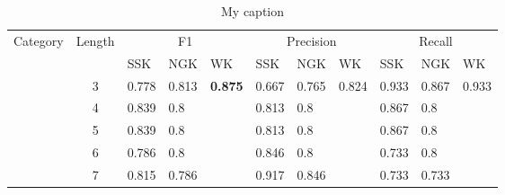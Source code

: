 \begin{table}[]
\centering
\caption{My caption}
\label{my-label}
\begin{tabular}{|c|c|l|l|l|l|l|l|l|l|l|}
\hline
Category                & Length                & \multicolumn{3}{c|}{F1}                                                                                                  & \multicolumn{3}{c|}{Precision} & \multicolumn{3}{c|}{Recall}                                                                   \\ \cline{3-11} 
\multicolumn{1}{|l|}{}  & \multicolumn{1}{l|}{} & SSK                                    & NGK                                    & WK                                     & SSK      & NGK      & WK       & SSK                           & NGK                           & WK                            \\ \hline
                        & 3                     & \cellcolor[HTML]{EFEFEF}0.778          & \cellcolor[HTML]{EFEFEF}0.813          & \cellcolor[HTML]{EFEFEF}\textbf{0.875} & 0.667    & 0.765    & 0.824    & \cellcolor[HTML]{EFEFEF}0.933 & \cellcolor[HTML]{EFEFEF}0.867 & \cellcolor[HTML]{EFEFEF}0.933 \\ \cline{2-11} 
                        & 4                     & \cellcolor[HTML]{EFEFEF}0.839          & \cellcolor[HTML]{EFEFEF}0.8            & \cellcolor[HTML]{EFEFEF}               & 0.813    & 0.8      &          & \cellcolor[HTML]{EFEFEF}0.867 & \cellcolor[HTML]{EFEFEF}0.8   & \cellcolor[HTML]{EFEFEF}      \\ \cline{2-11} 
                        & 5                     & \cellcolor[HTML]{EFEFEF}0.839          & \cellcolor[HTML]{EFEFEF}0.8            & \cellcolor[HTML]{EFEFEF}               & 0.813    & 0.8      &          & \cellcolor[HTML]{EFEFEF}0.867 & \cellcolor[HTML]{EFEFEF}0.8   & \cellcolor[HTML]{EFEFEF}      \\ \cline{2-11} 
                        & 6                     & \cellcolor[HTML]{EFEFEF}0.786          & \cellcolor[HTML]{EFEFEF}0.8            & \cellcolor[HTML]{EFEFEF}               & 0.846    & 0.8      &          & \cellcolor[HTML]{EFEFEF}0.733 & \cellcolor[HTML]{EFEFEF}0.8   & \cellcolor[HTML]{EFEFEF}      \\ \cline{2-11} 
                        & 7                     & \cellcolor[HTML]{EFEFEF}0.815          & \cellcolor[HTML]{EFEFEF}0.786          & \cellcolor[HTML]{EFEFEF}               & 0.917    & 0.846    &          & \cellcolor[HTML]{EFEFEF}0.733 & \cellcolor[HTML]{EFEFEF}0.733 & \cellcolor[HTML]{EFEFEF}      \\ \cline{2-11} 

\end{tabular}
\end{table}
